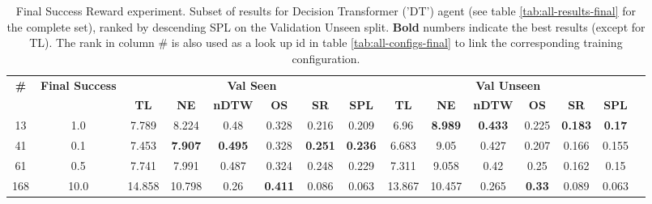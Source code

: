 \begin{table}
\centering
\caption{\label{tab:dt_reward_scale}Final Success Reward experiment. Subset of results for Decision Transformer ('DT') agent (see table \ref{tab:all-results-final} for the complete set), ranked by descending SPL on the Validation Unseen split. \textbf{Bold} numbers indicate the best results (except for TL). The rank in column \# is also used as a look up id in table \ref{tab:all-configs-final} to link the corresponding training configuration.}
\begin{tabular}{@{\hskip3pt}c@{\hskip3pt}c@{\hskip3pt}c@{\hskip3pt}c@{\hskip3pt}c@{\hskip3pt}c@{\hskip3pt}c@{\hskip3pt}c@{\hskip3pt}c@{\hskip3pt}c@{\hskip3pt}c@{\hskip3pt}c@{\hskip3pt}c@{\hskip3pt}c@{\hskip3pt}c}
\toprule
                                  \textbf{\#} & \textbf{Final Success} & \multicolumn{6}{c}{\textbf{Val Seen}} & \multicolumn{6}{c}{\textbf{Val Unseen}} \\
\cmidrule(l){3-8}\cmidrule(l){9-14}\textbf{~} &             \textbf{~} &       \textbf{TL} &     \textbf{NE} &   \textbf{nDTW} &     \textbf{OS} &     \textbf{SR} &    \textbf{SPL} &         \textbf{TL} &     \textbf{NE} &   \textbf{nDTW} &    \textbf{OS} &     \textbf{SR} &   \textbf{SPL} \\
\midrule
                                           13 &                    1.0 &             7.789 &           8.224 &            0.48 &           0.328 &           0.216 &           0.209 &                6.96 &  \textbf{8.989} &  \textbf{0.433} &          0.225 &  \textbf{0.183} &  \textbf{0.17} \\
                                           41 &                    0.1 &             7.453 &  \textbf{7.907} &  \textbf{0.495} &           0.328 &  \textbf{0.251} &  \textbf{0.236} &               6.683 &            9.05 &           0.427 &          0.207 &           0.166 &          0.155 \\
                                           61 &                    0.5 &             7.741 &           7.991 &           0.487 &           0.324 &           0.248 &           0.229 &               7.311 &           9.058 &            0.42 &           0.25 &           0.162 &           0.15 \\
                                          168 &                   10.0 &            14.858 &          10.798 &            0.26 &  \textbf{0.411} &           0.086 &           0.063 &              13.867 &          10.457 &           0.265 &  \textbf{0.33} &           0.089 &          0.063 \\
\bottomrule
\end{tabular}
\end{table}
